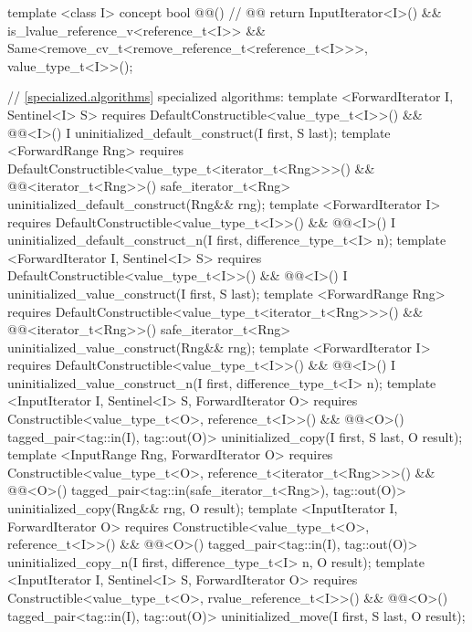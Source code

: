 {\color{addclr}
\begin{codeblock}
template <class I>
concept bool @@() { // @\expos @
  return InputIterator<I>() &&
    is_lvalue_reference_v<reference_t<I>> &&
    Same<remove_cv_t<remove_reference_t<reference_t<I>>>, value_type_t<I>>();
}

// \ref{specialized.algorithms} specialized algorithms:
template <ForwardIterator I, Sentinel<I> S>
  requires DefaultConstructible<value_type_t<I>>() &&
           @@<I>()
    I uninitialized_default_construct(I first, S last);
template <ForwardRange Rng>
  requires DefaultConstructible<value_type_t<iterator_t<Rng>>>() &&
           @@<iterator_t<Rng>>()
    safe_iterator_t<Rng>
    uninitialized_default_construct(Rng&& rng);
template <ForwardIterator I>
  requires DefaultConstructible<value_type_t<I>>() &&
           @@<I>()
    I uninitialized_default_construct_n(I first, difference_type_t<I> n);
template <ForwardIterator I, Sentinel<I> S>
  requires DefaultConstructible<value_type_t<I>>() &&
           @@<I>()
    I uninitialized_value_construct(I first, S last);
template <ForwardRange Rng>
  requires DefaultConstructible<value_type_t<iterator_t<Rng>>>() &&
           @@<iterator_t<Rng>>()
    safe_iterator_t<Rng>
    uninitialized_value_construct(Rng&& rng);
template <ForwardIterator I>
  requires DefaultConstructible<value_type_t<I>>() &&
           @@<I>()
    I uninitialized_value_construct_n(I first, difference_type_t<I> n);
template <InputIterator I, Sentinel<I> S, ForwardIterator O>
  requires Constructible<value_type_t<O>, reference_t<I>>() &&
           @@<O>()
    tagged_pair<tag::in(I), tag::out(O)>
    uninitialized_copy(I first, S last, O result);
template <InputRange Rng, ForwardIterator O>
  requires Constructible<value_type_t<O>, reference_t<iterator_t<Rng>>>() &&
           @@<O>()
    tagged_pair<tag::in(safe_iterator_t<Rng>), tag::out(O)>
    uninitialized_copy(Rng&& rng, O result);
template <InputIterator I, ForwardIterator O>
  requires Constructible<value_type_t<O>, reference_t<I>>() &&
           @@<O>()
    tagged_pair<tag::in(I), tag::out(O)>
    uninitialized_copy_n(I first, difference_type_t<I> n, O result);
template <InputIterator I, Sentinel<I> S, ForwardIterator O>
  requires Constructible<value_type_t<O>, rvalue_reference_t<I>>() &&
           @@<O>()
    tagged_pair<tag::in(I), tag::out(O)> uninitialized_move(I first, S last, O result);

\end{codeblock}}
